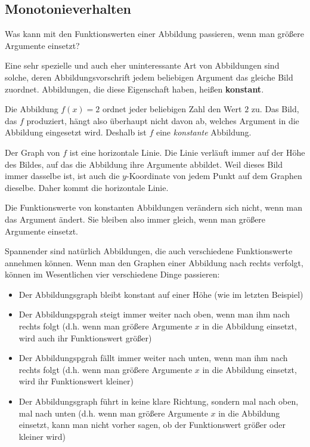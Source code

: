 \documentclass[../../main.tex]{subfiles}
\begin{document}
\subsection{Monotonieverhalten}
\label{sec:abbildungen_monotonie}

Was kann mit den Funktionswerten einer Abbildung passieren, wenn man größere Argumente einsetzt?

Eine sehr spezielle und auch eher uninteressante Art von Abbildungen sind solche, deren Abbildungsvorschrift jedem beliebigen Argument das gleiche Bild zuordnet. Abbildungen, die diese Eigenschaft haben, heißen \textbf{konstant}.

\begin{example}
    
    Die Abbildung $f(x)=2$ ordnet jeder beliebigen Zahl den Wert $2$ zu. Das Bild, das $f$ produziert, hängt also überhaupt nicht davon ab, welches Argument in die Abbildung eingesetzt wird. Deshalb ist $f$ eine \emph{konstante} Abbildung.
    
    Der Graph von $f$ ist eine horizontale Linie. Die Linie verläuft immer auf der Höhe des Bildes, auf das die Abbildung ihre Argumente abbildet. Weil dieses Bild immer dasselbe ist, ist auch die $y$-Koordinate von jedem Punkt auf dem Graphen dieselbe. Daher kommt die horizontale Linie.
\end{example}

Die Funktionswerte von konstanten Abbildungen verändern sich nicht, wenn man das Argument ändert. Sie bleiben also immer gleich, wenn man größere Argumente einsetzt.

Spannender sind natürlich Abbildungen, die auch verschiedene Funktionswerte annehmen können. Wenn man den Graphen einer Abbildung nach rechts verfolgt, können im Wesentlichen vier verschiedene Dinge passieren:
\begin{itemize}
    \item Der Abbildungsgraph bleibt konstant auf einer Höhe (wie im letzten Beispiel)
    \item Der Abbildungspgrah steigt immer weiter nach oben, wenn man ihm nach rechts folgt (d.h. wenn man größere Argumente $x$ in die Abbildung einsetzt, wird auch ihr Funktionswert größer)
    \item Der Abbildungspgrah fällt immer weiter nach unten, wenn man ihm nach rechts folgt (d.h. wenn man größere Argumente $x$ in die Abbildung einsetzt, wird ihr Funktionswert kleiner)
    \item Der Abbildungsgraph führt in keine klare Richtung, sondern mal nach oben, mal nach unten (d.h. wenn man größere Argumente $x$ in die Abbildung einsetzt, kann man nicht vorher sagen, ob der Funktionswert größer oder kleiner wird)
\end{itemize}
\end{document}
